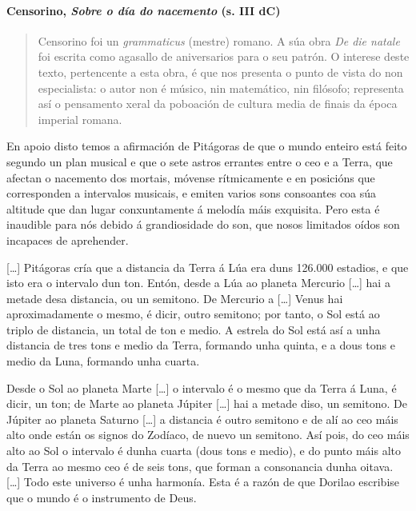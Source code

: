 

\paragraph{\texorpdfstring{Censorino, \emph{Sobre o día do nacemento}
(s. III
dC)}{Censorino, Sobre o día do nacemento (s. III dC)}}\label{censorino--sobre-o-duxeda-do-nacemento--s.-iii-dc}

\begin{quote}
Censorino foi un \emph{grammaticus} (mestre) romano. A súa obra \emph{De die natale} foi escrita como agasallo de aniversarios para o seu patrón. O interese deste texto, pertencente a esta obra, é que nos presenta o punto de vista do non especialista: o autor non é músico, nin matemático, nin filósofo; representa así o pensamento xeral da poboación de cultura media de finais da época imperial romana.
\end{quote}


\begin{multicols}{3}
\setlength{\columnseprule}{1pt}
{\small

\noindent
En apoio disto temos a afirmación de Pitágoras de que o mundo enteiro está feito segundo un plan musical e que o sete astros errantes entre o ceo e a Terra, que afectan o nacemento dos mortais, móvense rítmicamente e en posicións que corresponden a intervalos musicais, e emiten varios sons consoantes coa súa altitude que dan lugar conxuntamente á melodía
máis exquisita. Pero esta é inaudible para nós debido á grandiosidade do son, que nosos limitados oídos son incapaces de aprehender.

\noindent
{[}\ldots{}{]} Pitágoras cría que a distancia da Terra á Lúa era duns 126.000 estadios, e que isto era o intervalo dun ton. Entón, desde a Lúa ao planeta Mercurio {[}\ldots{}{]} hai a metade desa distancia, ou un semitono. De Mercurio a {[}\ldots{}{]} Venus hai aproximadamente o mesmo, é dicir, outro semitono; por tanto, o Sol está ao triplo de
distancia, un total de ton e medio. A estrela do Sol está así a unha distancia de tres tons e medio da Terra, formando unha quinta, e a dous tons e medio da Luna, formando unha cuarta.

\noindent
Desde o Sol ao planeta Marte {[}\ldots{}{]} o intervalo é o mesmo que da Terra á Luna, é dicir, un ton; de Marte ao planeta Júpiter {[}\ldots{}{]} hai a metade diso, un semitono. De Júpiter ao planeta Saturno {[}\ldots{}{]} a distancia é outro semitono e de alí ao ceo máis alto onde están os signos do Zodíaco, de nuevo un semitono. Así pois, do ceo máis alto ao Sol o intervalo é dunha cuarta (dous tons e medio), e do punto máis alto da Terra ao mesmo ceo é de seis tons, que forman a consonancia dunha oitava. {[}\ldots{}{]} Todo este universo é unha harmonía. Esta é a razón de que Dorilao escribise que o mundo é o instrumento de Deus.
}
\end{multicols}



